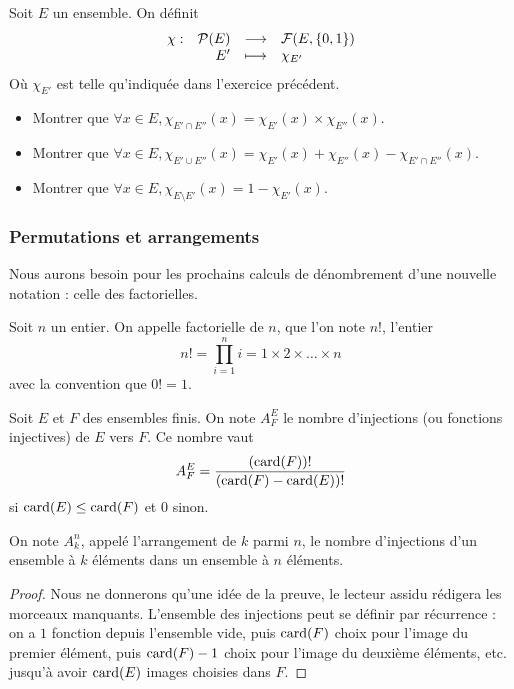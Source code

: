 \begin{exo}
    Soit $E$ un ensemble. On définit $$\begin{array}[t]{lrcl} \chi: & \mathcal P (E) & \longrightarrow & \mathcal F(E,\{0,1\}) \\ & E' & \longmapsto & \chi_{E'} \end{array}$$ Où $\chi_{E'}$ est telle qu'indiquée dans l'exercice précédent.
    \begin{itemize}[label=$\bullet$]
        \item Montrer que $\forall x\in E, \chi_{E'\cap E''}(x)=\chi_{E'}(x)\times \chi_{E''}(x)$.
        \item Montrer que $\forall x\in E,\chi_{E'\cup E''}(x)=\chi_{E'}(x)+\chi_{E''}(x)-\chi_{E'\cap E''}(x)$.
        \item Montrer que $\forall x\in E, \chi_{E\setminus E'}(x)=1-\chi_{E'}(x)$.
    \end{itemize}
\end{exo}

\subsubsection{Permutations et arrangements}

Nous aurons besoin pour les prochains calculs de dénombrement d'une nouvelle notation : celle des factorielles.

\begin{defi}[Factorielle]
    Soit $n$ un entier. On appelle factorielle de $n$, que l'on note $n!$, l'entier $$n!=\prod_{i=1}^n i=1\times 2\times \ldots \times n$$ avec la convention que $0!=1$.
\end{defi}

\begin{defi}[Arrangement]
    Soit $E$ et $F$ des ensembles finis. On note $A^E_F$ le nombre d'injections (ou fonctions injectives) de $E$ vers $F$. Ce nombre vaut $$A^E_F=\frac{(\mathrm{card}(F))!}{(\mathrm{card}(F) - \mathrm{card}(E))!}$$ si $\mathrm{card}(E) \leq \mathrm{card}(F)$ et $0$ sinon.
    
    On note $A^n_k$, appelé l'arrangement de $k$ parmi $n$, le nombre d'injections d'un ensemble à $k$ éléments dans un ensemble à $n$ éléments.
\end{defi}
\begin{proof}
    Nous ne donnerons qu'une idée de la preuve, le lecteur assidu rédigera les morceaux manquants. L'ensemble des injections peut se définir par récurrence : on a $1$ fonction depuis l'ensemble vide, puis $\mathrm{card}(F)$ choix pour l'image du premier élément, puis $\mathrm{card}(F)-1$ choix pour l'image du deuxième éléments, etc. jusqu'à avoir $\mathrm{card}(E)$ images choisies dans $F$.
\end{proof}

